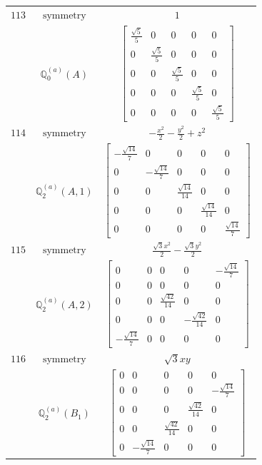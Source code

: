 \documentclass[fleqn,8pt,landscape]{jsarticle}
\begin{document}
\begin{longtable}{ccc}
$ 113 $ & $ \text{symmetry} $ & $ 1 $ \\
$  $ & $ \mathbb{Q}_{0}^{(a)}(A) $ & $ \begin{bmatrix} \frac{\sqrt{5}}{5} & 0 & 0 & 0 & 0 \\ 0 & \frac{\sqrt{5}}{5} & 0 & 0 & 0 \\ 0 & 0 & \frac{\sqrt{5}}{5} & 0 & 0 \\ 0 & 0 & 0 & \frac{\sqrt{5}}{5} & 0 \\ 0 & 0 & 0 & 0 & \frac{\sqrt{5}}{5} \end{bmatrix} $ \\ \hline
$ 114 $ & $ \text{symmetry} $ & $ - \frac{x^{2}}{2} - \frac{y^{2}}{2} + z^{2} $ \\
$  $ & $ \mathbb{Q}_{2}^{(a)}(A,1) $ & $ \begin{bmatrix} - \frac{\sqrt{14}}{7} & 0 & 0 & 0 & 0 \\ 0 & - \frac{\sqrt{14}}{7} & 0 & 0 & 0 \\ 0 & 0 & \frac{\sqrt{14}}{14} & 0 & 0 \\ 0 & 0 & 0 & \frac{\sqrt{14}}{14} & 0 \\ 0 & 0 & 0 & 0 & \frac{\sqrt{14}}{7} \end{bmatrix} $ \\ \hline
$ 115 $ & $ \text{symmetry} $ & $ \frac{\sqrt{3} x^{2}}{2} - \frac{\sqrt{3} y^{2}}{2} $ \\
$  $ & $ \mathbb{Q}_{2}^{(a)}(A,2) $ & $ \begin{bmatrix} 0 & 0 & 0 & 0 & - \frac{\sqrt{14}}{7} \\ 0 & 0 & 0 & 0 & 0 \\ 0 & 0 & \frac{\sqrt{42}}{14} & 0 & 0 \\ 0 & 0 & 0 & - \frac{\sqrt{42}}{14} & 0 \\ - \frac{\sqrt{14}}{7} & 0 & 0 & 0 & 0 \end{bmatrix} $ \\ \hline
$ 116 $ & $ \text{symmetry} $ & $ \sqrt{3} x y $ \\
$  $ & $ \mathbb{Q}_{2}^{(a)}(B_{1}) $ & $ \begin{bmatrix} 0 & 0 & 0 & 0 & 0 \\ 0 & 0 & 0 & 0 & - \frac{\sqrt{14}}{7} \\ 0 & 0 & 0 & \frac{\sqrt{42}}{14} & 0 \\ 0 & 0 & \frac{\sqrt{42}}{14} & 0 & 0 \\ 0 & - \frac{\sqrt{14}}{7} & 0 & 0 & 0 \end{bmatrix} $ \\ \hline

\end{longtable}
\end{document}
